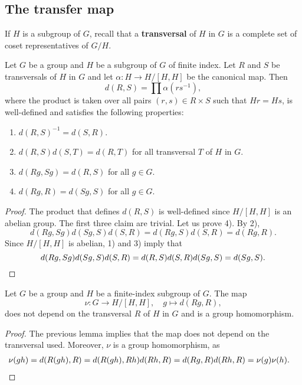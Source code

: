 \section{}

\subsection{The transfer map}

If $H$ is a subgroup of $G$, recall that 
a \textbf{transversal} of $H$ in $G$ is a complete
set of coset representatives of $G/H$. 

\begin{lemma}
	\label{lem:d:transfer}
	Let $G$ be a group and $H$ be a subgroup of $G$ of finite index.  Let $R$
	and $S$ be transversals of $H$ in $G$ and let $\alpha\colon H\to H/[H,H]$
	be the canonical map. Then 
	\[
		d(R,S)=\prod \alpha(rs^{-1}),
	\]
	where the product is taken over all pairs 
	$(r,s)\in R\times S$ such that $Hr=Hs$,
	is well-defined and satisfies the following properties:
	\begin{enumerate}
		\item $d(R,S)^{-1}=d(S,R)$.
		\item $d(R,S)d(S,T)=d(R,T)$ for all transversal $T$ of $H$ in $G$.
		\item $d(Rg,Sg)=d(R,S)$ for all $g\in G$.
		\item $d(Rg,R)=d(Sg,S)$ for all $g\in G$.
	\end{enumerate}
\end{lemma}

\begin{proof}
	The product that defines $d(R,S)$ is well-defined since $H/[H,H]$ is 
	an abelian group. The first three claim are trivial. Let us prove
	4). By 2), 
	\[
		d(Rg,Sg)d(Sg,S)d(S,R)=d(Rg,S)d(S,R)=d(Rg,R).
	\]
	Since $H/[H,H]$ is abelian, 1) and 3) imply that 	
	\[
		d(Rg,Sg)d(Sg,S)d(S,R)=d(R,S)d(S,R)d(Sg,S)=d(Sg,S).\qedhere
	\]
\end{proof}

\begin{theorem}
	\label{thm:transfer}
	Let $G$ be a group and $H$ be a finite-index subgroup of $G$. The map 	
	\[
		\nu\colon G\to H/[H,H],\quad
		g\mapsto d(Rg,R),
	\]
	does not depend on the transversal $R$ of $H$ in $G$ and is a group
	homomorphism. 
\end{theorem}

\begin{proof}
	The previous lemma implies that the map does not depend on the transversal used. 
	Moreover, $\nu$ is a group homomorphism, as 
	\begin{align*}
		\nu(gh)&=d(R(gh),R)
		=d(R(gh),Rh)d(Rh,R)
		=d(Rg,R)d(Rh,R)=\nu(g)\nu(h).\qedhere
	\end{align*}
\end{proof}

